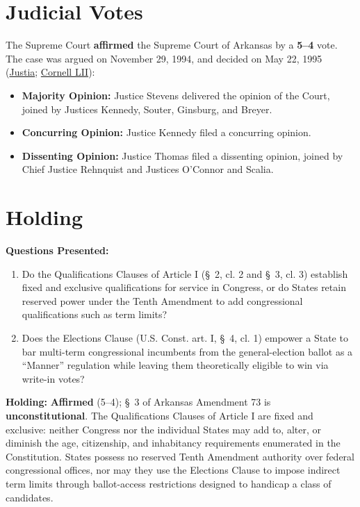\documentclass[12pt]{article}
\begin{document}
\section{Judicial Votes}
The Supreme Court \textbf{affirmed} the Supreme Court of Arkansas by a \textbf{5--4} vote. The case was argued on November 29, 1994, and decided on May 22, 1995 (\href{https://supreme.justia.com/cases/federal/us/514/779/}{Justia}; \href{https://www.law.cornell.edu/supremecourt/text/514/779}{Cornell LII}):

\begin{itemize}
    \item \textbf{Majority Opinion:} Justice Stevens delivered the opinion of the Court, joined by Justices Kennedy, Souter, Ginsburg, and Breyer.
    \item \textbf{Concurring Opinion:} Justice Kennedy filed a concurring opinion.
    \item \textbf{Dissenting Opinion:} Justice Thomas filed a dissenting opinion, joined by Chief Justice Rehnquist and Justices O'Connor and Scalia.
\end{itemize}

\section{Holding}
\textbf{Questions Presented:}

\begin{enumerate}
    \item Do the Qualifications Clauses of Article I (\S~2, cl. 2 and \S~3, cl. 3) establish fixed and exclusive qualifications for service in Congress, or do States retain reserved power under the Tenth Amendment to add congressional qualifications such as term limits?
    \item Does the Elections Clause (U.S. Const. art. I, \S~4, cl. 1) empower a State to bar multi-term congressional incumbents from the general-election ballot as a ``Manner'' regulation while leaving them theoretically eligible to win via write-in votes?
\end{enumerate}

\textbf{Holding:} \textbf{Affirmed} (5--4); \S~3 of Arkansas Amendment 73 is \textbf{unconstitutional}. The Qualifications Clauses of Article I are fixed and exclusive: neither Congress nor the individual States may add to, alter, or diminish the age, citizenship, and inhabitancy requirements enumerated in the Constitution. States possess no reserved Tenth Amendment authority over federal congressional offices, nor may they use the Elections Clause to impose indirect term limits through ballot-access restrictions designed to handicap a class of candidates.
\end{document}
